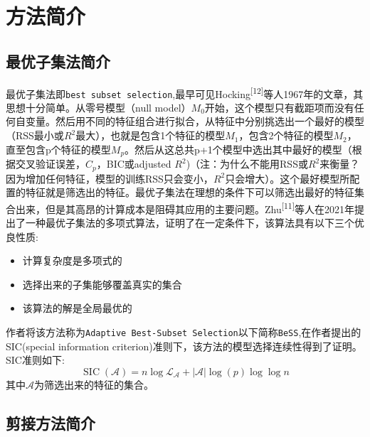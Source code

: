 \documentclass[
]{ctexart}
\newcommand{\passthrough}[1]{#1}
\providecommand{\tightlist}{%
  \setlength{\itemsep}{0pt}\setlength{\parskip}{0pt}}
\begin{document}
\hypertarget{ux65b9ux6cd5ux7b80ux4ecb}{%
\section{方法简介}\label{ux65b9ux6cd5ux7b80ux4ecb}}

\hypertarget{ux6700ux4f18ux5b50ux96c6ux6cd5ux7b80ux4ecb}{%
\subsection{最优子集法简介}\label{ux6700ux4f18ux5b50ux96c6ux6cd5ux7b80ux4ecb}}

最优子集法即\passthrough{\lstinline!best subset selection!},最早可见Hocking\textsuperscript{{[}12{]}}等人1967年的文章，其思想十分简单。从零号模型（null
model）\(M_0\)开始，这个模型只有截距项而没有任何自变量。然后用不同的特征组合进行拟合，从特征中分别挑选出一个最好的模型（RSS最小或\(R^2\)最大），也就是包含1个特征的模型\(M_1\)，包含2个特征的模型\(M_2\)，直至包含p个特征的模型\(M_p\)。然后从这总共p+1个模型中选出其中最好的模型（根据交叉验证误差，\(C_p\)，BIC或adjusted
\(R^2\))（注：为什么不能用RSS或\(R^2\)来衡量？因为增加任何特征，模型的训练RSS只会变小，\(R^2\)只会增大）。这个最好模型所配置的特征就是筛选出的特征。最优子集法在理想的条件下可以筛选出最好的特征集合出来，但是其高昂的计算成本是阻碍其应用的主要问题。Zhu\textsuperscript{{[}11{]}}等人在2021年提出了一种最优子集法的多项式算法，证明了在一定条件下，该算法具有以下三个优良性质:

\begin{itemize}
\tightlist
\item
  计算复杂度是多项式的
\item
  选择出来的子集能够覆盖真实的集合
\item
  该算法的解是全局最优的
\end{itemize}

作者将该方法称为\passthrough{\lstinline!Adaptive Best-Subset Selection!}以下简称\passthrough{\lstinline!BeSS!},在作者提出的SIC(special
information
criterion)准则下，该方法的模型选择连续性得到了证明。SIC准则如下:
\[\operatorname{SIC}(\mathcal{A})=n \log \mathcal{L}_{\mathcal{A}}+|\mathcal{A}| \log (p) \log \log n\]
其中\(\mathcal{A}\)为筛选出来的特征的集合。

\hypertarget{ux526aux63a5ux65b9ux6cd5ux7b80ux4ecb}{%
\subsection{剪接方法简介}\label{ux526aux63a5ux65b9ux6cd5ux7b80ux4ecb}}
\end{document}
